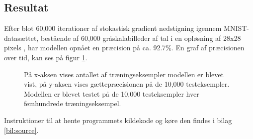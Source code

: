 \documentclass[../SOP.tex]{subfile}
\begin{document}
\subsection{Resultat}
Efter blot 60,000 iterationer af stokastisk gradient nedstigning igennem MNIST-datasættet, bestående af 60,000 gråskalabilleder af tal i en opløsning af 28x28 pixels \parencite{mnist}, har modellen opnået en præcision på ca. 92.7\%. En graf af præcisionen over tid, kan ses på figur \ref{fig:accGraph}.
\begin{figure}[ht]
  \centering
  
  \caption{På x-aksen vises antallet af træningseksempler modellen er blevet vist, på y-aksen vises gættepræcisionen på de 10,000 testeksempler. Modellen er blevet testet på de 10,000 testeksempler hver femhundrede træningseksempel.}
  
  \label{fig:accGraph}
\end{figure}
Instruktioner til at hente programmets kildekode og køre den findes i bilag \ref{bil:source}.
\end{document}
